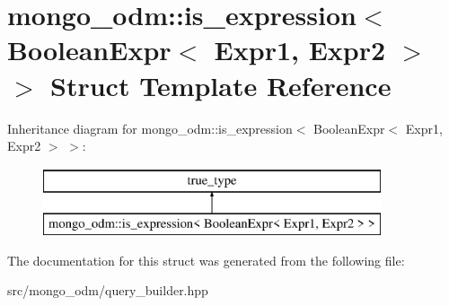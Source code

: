 \hypertarget{structmongo__odm_1_1is__expression_3_01BooleanExpr_3_01Expr1_00_01Expr2_01_4_01_4}{}\section{mongo\+\_\+odm\+:\+:is\+\_\+expression$<$ Boolean\+Expr$<$ Expr1, Expr2 $>$ $>$ Struct Template Reference}
\label{structmongo__odm_1_1is__expression_3_01BooleanExpr_3_01Expr1_00_01Expr2_01_4_01_4}
Inheritance diagram for mongo\+\_\+odm\+:\+:is\+\_\+expression$<$ Boolean\+Expr$<$ Expr1, Expr2 $>$ $>$\+:\begin{figure}[H]
\begin{center}
\leavevmode
\includegraphics[height=2.000000cm]{structmongo__odm_1_1is__expression_3_01BooleanExpr_3_01Expr1_00_01Expr2_01_4_01_4}
\end{center}
\end{figure}


The documentation for this struct was generated from the following file\+:\begin{DoxyCompactItemize}
\item 
src/mongo\+\_\+odm/query\+\_\+builder.\+hpp\end{DoxyCompactItemize}
